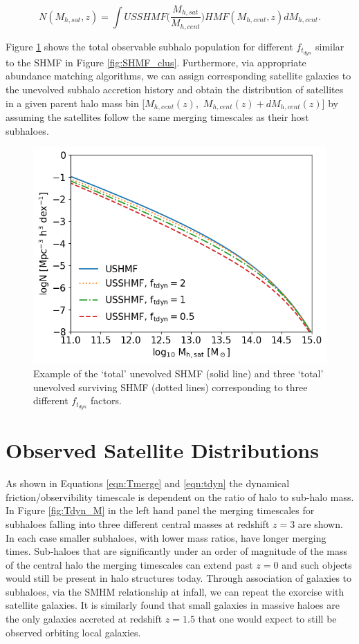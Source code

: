 \begin{equation}
\label{eqn:GSHMF}
N(M_{h, sat}, z) =
\int USSHMF\Bigg(\frac{M_{h, sat}}{M_{h, cent}}\Bigg)HMF(M_{h, cent}, z)dM_{h, cent}.
\end{equation}

Figure \ref{fig:SHMF} shows the total observable subhalo population for different  $f_{t_{dyn}}$ similar to the SHMF in Figure \ref{fig:SHMF_clus}. Furthermore, via appropriate abundance matching algorithms, we can assign corresponding satellite galaxies to the unevolved subhalo accretion history and obtain the distribution of satellites in a given parent halo mass bin $[M_{h,cent}(z),$ $M_{h,cent}(z) + dM_{h,cent}(z)]$ by assuming the satellites follow the same merging timescales as their host subhaloes.

\begin{figure}
	\centering
	\includegraphics[width = \linewidth]{Figures/Chapter3/SHMF.png}
	\caption{Example of the `total' unevolved SHMF (solid line) and three `total' unevolved surviving SHMF (dotted lines) corresponding to three different $f_{t_{dyn}}$ factors.}
	\label{fig:SHMF}
\end{figure}

\section{Observed Satellite Distributions}

As shown in Equations \ref{eqn:Tmerge} and \ref{eqn:tdyn} the dynamical friction/observibility timescale is dependent on the ratio of halo to sub-halo mass. In Figure \ref{fig:Tdyn_M} in the left hand panel the merging timescales for subhaloes falling into three different central masses at redshift $z=3$ are shown. In each case smaller subhaloes, with lower mass ratios, have longer merging times. Sub-haloes that are significantly under an order of magnitude of the mass of the central halo the merging timescales can extend past $z=0$ and such objects would still be present in halo structures today. Through association of galaxies to subhaloes, via the SMHM relationship at infall, we can repeat the exorcise with satellite galaxies. It is similarly found that small galaxies in massive haloes are the only galaxies accreted at redshift $z = 1.5$ that one would expect to still be observed orbiting local galaxies.

